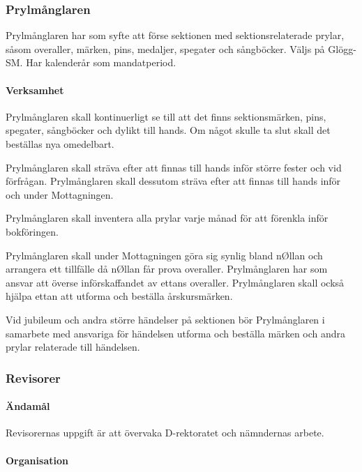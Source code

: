 \documentclass{dgovdoc}
\begin{document}
\subsubsection{Prylmånglaren}

Prylmånglaren har som syfte att förse sektionen med sektionsrelaterade prylar,
såsom overaller, märken, pins, medaljer, spegater och sångböcker. Väljs på Glögg-SM. Har
kalenderår som mandatperiod.

\paragraph{Verksamhet}

Prylmånglaren skall kontinuerligt se till att det finns sektionsmärken, pins,
spegater, sångböcker och dylikt till hands. Om något skulle ta slut skall det
beställas nya omedelbart.

Prylmånglaren skall sträva efter att finnas till hands inför större fester och
vid förfrågan. Prylmånglaren skall dessutom sträva efter att finnas till hands
inför och under Mottagningen.

Prylmånglaren skall inventera alla prylar varje månad för att förenkla inför
bokföringen.

Prylmånglaren skall under Mottagningen göra sig synlig bland nØllan och
arrangera ett tillfälle då nØllan får prova overaller. Prylmånglaren har som
ansvar att överse införskaffandet av ettans overaller. Prylmånglaren skall
också hjälpa ettan att utforma och beställa årskursmärken.

Vid jubileum och andra större händelser på sektionen bör Prylmånglaren i
samarbete med ansvariga för händelsen utforma och beställa märken och andra
prylar relaterade till händelsen.

\subsubsection{Revisorer}

\paragraph{Ändamål}

Revisorernas uppgift är att övervaka D-rektoratet och nämndernas arbete.

\paragraph{Organisation}
\end{document}
